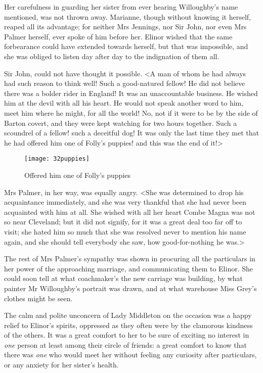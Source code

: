 Her carefulness in guarding her sister from ever hearing Willoughby's name mentioned, was not thrown away. Marianne, though without knowing it herself, reaped all its advantage; for neither Mrs Jennings, nor Sir John, nor even Mrs Palmer herself, ever spoke of him before her. Elinor wished that the same forbearance could have extended towards herself, but that was impossible, and she was obliged to listen day after day to the indignation of them all.

Sir John, could not have thought it possible. <A man of whom he had always had such reason to think well! Such a good-natured fellow! He did not believe there was a bolder rider in England! It was an unaccountable business. He wished him at the devil with all his heart. He would not speak another word to him, meet him where he might, for all the world! No, not if it were to be by the side of Barton covert, and they were kept watching for two hours together. Such a scoundrel of a fellow! such a deceitful dog! It was only the last time they met that he had offered him one of Folly's puppies! and this was the end of it!>

\begin{figure}[tbph]
\centering
\texttt{[image: 32puppies]}
\caption{Offered him one of Folly's puppies}
\end{figure}

Mrs Palmer, in her way, was equally angry. <She was determined to drop his acquaintance immediately, and she was very thankful that she had never been acquainted with him at all. She wished with all her heart Combe Magna was not so near Cleveland; but it did not signify, for it was a great deal too far off to visit; she hated him so much that she was resolved never to mention his name again, and she should tell everybody she saw, how good-for-nothing he was.>

The rest of Mrs Palmer's sympathy was shown in procuring all the particulars in her power of the approaching marriage, and communicating them to Elinor. She could soon tell at what coachmaker's the new carriage was building, by what painter Mr Willoughby's portrait was drawn, and at what warehouse Miss Grey's clothes might be seen.

The calm and polite unconcern of Lady Middleton on the occasion was a happy relief to Elinor's spirits, oppressed as they often were by the clamorous kindness of the others. It was a great comfort to her to be sure of exciting no interest in \textit{one} person at least among their circle of friends: a great comfort to know that there was \textit{one} who would meet her without feeling any curiosity after particulars, or any anxiety for her sister's health.

